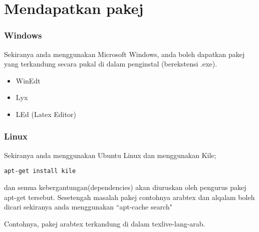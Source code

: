 \section{Mendapatkan pakej \latex}

\subsubsection{Windows}

Sekiranya anda menggunakan Microsoft Windows, anda boleh dapatkan pakej \latex{} yang terkandung secara pukal di dalam penginstal (berekstensi .exe).\\

\begin{itemize}

\item WinEdt\cite{winedt} 
\item Lyx\cite{lyx} 
\item LEd (Latex Editor) \cite{led}

\end{itemize}


\subsubsection{Linux}

Sekiranya anda menggunakan Ubuntu Linux dan menggunakan Kile\cite{kile}; \\

\begin{Verbatim}[frame=single]
apt-get install kile
\end{Verbatim}

dan semua kebergantungan(dependencies) akan diuruskan oleh pengurus pakej apt-get tersebut.
Sesetengah masalah pakej contohnya arabtex dan alqalam boleh dicari sekiranya anda menggunakan ``apt-cache search"

Contohnya, pakej arabtex terkandung di dalam texlive-lang-arab.


